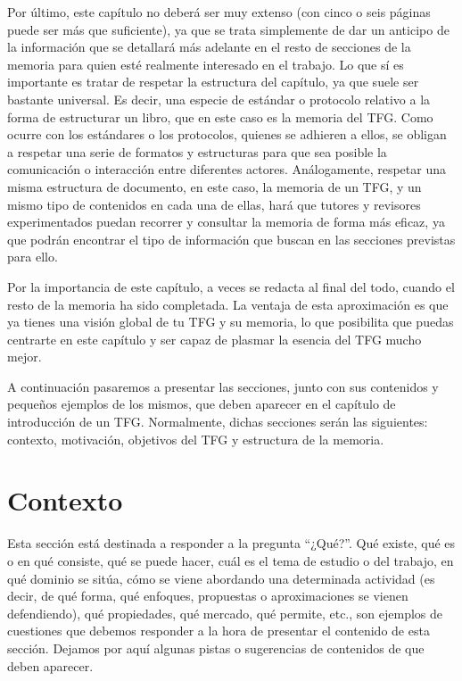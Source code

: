 Por último, este capítulo no deberá ser muy extenso (con cinco o seis páginas puede ser más que suficiente), ya que se trata simplemente de dar un anticipo de la información que se detallará más adelante en el resto de secciones de la memoria para quien esté realmente interesado en el trabajo. Lo que sí es importante es tratar de respetar la estructura del capítulo, ya que suele ser bastante universal. Es decir, una especie de estándar o protocolo relativo a la forma de estructurar un libro, que en este caso es la memoria del TFG. Como ocurre con los estándares o los protocolos, quienes se adhieren a ellos, se obligan a respetar una serie de formatos y estructuras para que sea posible la comunicación o interacción entre diferentes actores. Análogamente, respetar una misma estructura de documento, en este caso, la memoria de un TFG, y un mismo tipo de contenidos en cada una de ellas, hará que tutores y revisores experimentados puedan recorrer y consultar la memoria de forma más eficaz, ya que podrán encontrar el tipo de información que buscan en las secciones previstas para ello.

Por la importancia de este capítulo, a veces se redacta al final del todo, cuando el resto de la memoria ha sido completada. La ventaja de esta aproximación es que ya tienes una visión global de tu TFG y su memoria, lo que posibilita que puedas centrarte en este capítulo y ser capaz de plasmar la esencia del TFG mucho mejor.

A continuación pasaremos a presentar las secciones, junto con sus contenidos y pequeños ejemplos de los mismos, que deben aparecer en el capítulo de introducción de un TFG. Normalmente, dichas secciones serán las siguientes: contexto, motivación, objetivos del TFG y estructura de la memoria.

\section{Contexto}\label{Contexto}
Esta sección está destinada a responder a la pregunta ``¿Qué?''. Qué existe, qué es o en qué consiste, qué se puede hacer, cuál es el tema de estudio o del trabajo, en qué dominio se sitúa, cómo se viene abordando una determinada actividad (es decir, de qué forma, qué enfoques, propuestas o aproximaciones se vienen defendiendo), qué propiedades, qué mercado, qué permite, etc., son ejemplos de cuestiones que debemos responder a la hora de presentar el contenido de esta sección. Dejamos por aquí algunas pistas o sugerencias de contenidos de que deben aparecer.


